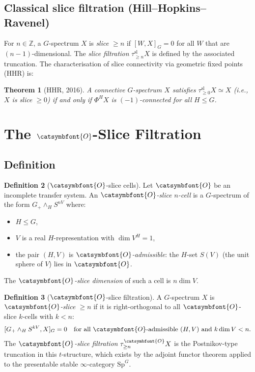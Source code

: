 \documentclass[12pt]{article}
\newtheorem{theorem}{Theorem}
\theoremstyle{definition}
\newtheorem{definition}[theorem]{Definition}
\theoremstyle{remark}
\newcommand{\aO}{{\catsymbfont{O}}}
\begin{document}
\subsection{Classical slice filtration (Hill--Hopkins--Ravenel)}

For $n\in\mathbb{Z}$, a $G$-spectrum $X$ is \emph{slice $\geq n$} if
$[W, X]_G = 0$ for all $W$ that are $(n-1)$-dimensional.  The \emph{slice
filtration} $\tau_{\geq n}^{\mathrm{sl}}X$ is defined by the associated
truncation.  The characterisation of slice connectivity via geometric fixed
points (HHR) is:

\begin{theorem}[HHR, 2016]\label{thm:HHR}
A connective $G$-spectrum $X$ satisfies $\tau_{\geq 0}^{\mathrm{sl}}X \simeq X$
(i.e., $X$ is slice $\geq 0$) if and only if $\Phi^H X$ is $(-1)$-connected
for all $H\leq G$.
\end{theorem}

\section{The $\aO$-Slice Filtration}

\subsection{Definition}

\begin{definition}[$\aO$-slice cells]\label{def:cells}
Let $\aO$ be an incomplete transfer system.  An \emph{$\aO$-slice $n$-cell}
is a $G$-spectrum of the form $G_+\wedge_H S^{nV}$ where:
\begin{itemize}
\item $H\leq G$,
\item $V$ is a real $H$-representation with $\dim V^H = 1$,
\item the pair $(H,V)$ is \emph{$\aO$-admissible}: the $H$-set $S(V)$
  (the unit sphere of $V$) lies in $\aO$.
\end{itemize}
The \emph{$\aO$-slice dimension} of such a cell is $n\dim V$.
\end{definition}

\begin{definition}[$\aO$-slice filtration]
A $G$-spectrum $X$ is \emph{$\aO$-slice $\geq n$} if it is right-orthogonal
to all $\aO$-slice $k$-cells with $k < n$:
\[
  [G_+\wedge_H S^{kV}, X]_G = 0
  \quad\text{for all $\aO$-admissible $(H,V)$ and $k\dim V < n$.}
\]
The \emph{$\aO$-slice filtration} $\tau_{\geq n}^{\aO}X$ is the Postnikov-type
truncation in this $t$-structure, which exists by the adjoint functor theorem
applied to the presentable stable $\infty$-category $\mathrm{Sp}^G$.
\end{definition}
\end{document}
